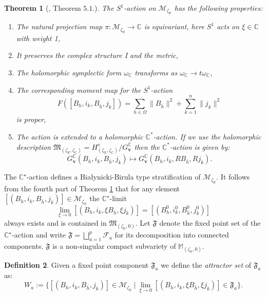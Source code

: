 \documentclass[12pt,oneside,reqno]{amsart}
\newtheorem{theorem}{Theorem}
\theoremstyle{definition}
\newtheorem{definition}[theorem]{Definition}
\numberwithin{equation}{section}
\numberwithin{theorem}{section}
\newcommand{\R}{\mathbb{R}}
\newcommand{\C}{\mathbb{C}}
\begin{document}
%
\begin{theorem}[\cite{Na1994}, Theorem $5.1.$]\label{CSA}
    The $S^1$-action on $\mathcal{M}_{\zeta_\R}$ has the following properties:
    \begin{enumerate}[label=(\roman*)]
    \item 
    The natural projection map $\pi: \mathcal M_{\zeta_\R}\longrightarrow   \C$ is equivariant, here $S^1$ acts on $\xi\in\C$ with weight 1,
    \item 
    It preserves the complex structure I and the metric,
    \item 
    The holomorphic symplectic form $\omega_\C$ transforms as   $\omega_\C\longrightarrow t\omega_\C$,
    \item 
    The corresponding moment map for the $S^1$-action
    \begin{equation*}
    F([B_h,i_k,B_{\bar h},j_k]) = \sum\limits_{ h \in \Omega}\|B_{\bar h}\|^2 + \sum\limits_{k=1}^n \|j_k\|^2
    \end{equation*}
    is proper,
    \item 
    The action is extended to a holomorphic $\C^*$-action. If we use the    holomorphic description            $\mathfrak{M}_{(\zeta_\R,\zeta_\C)}=H^s_{(\zeta_\R,\zeta_\C)}/G^\C_\mathbf{    v}$ then the $\C^*$-action is given by:
    \begin{equation*}
    G^\C_\mathbf{v}(B_h,i_k,B_{\bar h},j_k) \mapsto G^\C_\mathbf{v}(B_h,i_k,RB_{\bar h},Rj_k).
    \end{equation*}
    \end{enumerate}
\end{theorem}
%
The $\C^{\star}$-action defines a Bia\l{}ynicki-Birula type stratification of $\mathcal M_{\zeta_{\R}}$. It follows from the fourth part of Theorem \ref{CSA} that for any element $[(B_h,i_k,B_{\bar h},j_k)] \in \mathcal M_{\zeta_{\R}}$ the $\C^{\star}$-limit 
%
\begin{equation}
\lim\limits_{\xi\to 0}[(B_h,i_k,\xi B_{\bar h},\xi j_k)] = [(B_h^0,i_k^0,B_{\bar h}^0,j_k^0)]
\end{equation}
%
always exists and is contained in $\mathfrak M_{(\zeta_{\R},0)}$. Let $\mathfrak F$ denote the fixed point set of the $\C^{\star}$-action and write $\mathfrak F = \bigsqcup\limits_{a=1}^p \mathcal F_a$ for its decomposition into connected components. $\mathfrak F$ is a non-singular compact subvariety of $\mathbb M_{(\zeta_{\R},0)}$. 
%
\begin{definition} Given a fixed point component $\mathfrak F_a$ we define the \textit{attractor set} of $\mathfrak F_a$ as:
%
\begin{equation}
W_a := \{[(B_h,i_k,B_{\bar h},j_k)]\in \mathcal M_{\zeta_{\R}}~|~\lim\limits_{\xi\to 0}[(B_h,i_k,\xi B_{\bar h},\xi j_k)] \in \mathfrak F_a\}.
\end{equation}
%
\end{definition}
\end{document}

